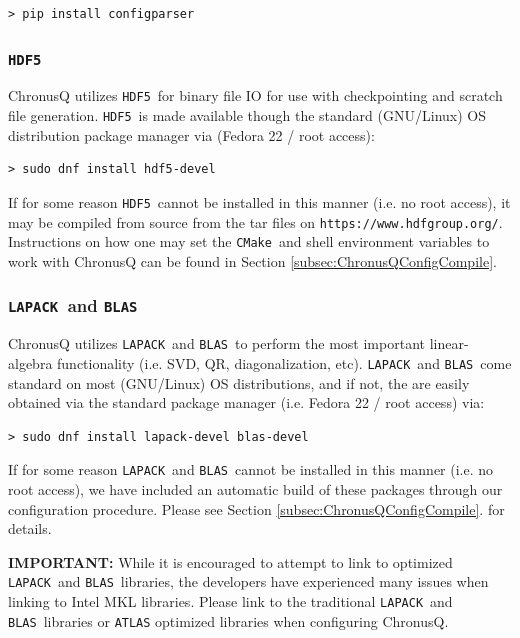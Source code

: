\documentclass[12pt]{article}
\newcommand{\CMake}{\texttt{CMake}}
\newcommand{\HDF}{\texttt{HDF5}}
\newcommand{\LAPACK}{\texttt{LAPACK}}
\newcommand{\BLAS}{\texttt{BLAS}}
\begin{document}
	\begin{lstlisting}
> pip install configparser
	\end{lstlisting}

      \subsubsection{\HDF} \label{subsubsec:HDF5} 
        ChronusQ utilizes \HDF~for binary file IO for use with 
        checkpointing and scratch file generation. \HDF~is made available
	though the standard (GNU/Linux) OS distribution package manager via
	(Fedora 22 / root access):

	\begin{lstlisting}
> sudo dnf install hdf5-devel
	\end{lstlisting}

	\noindent If for some reason \HDF~cannot be installed in this manner (i.e. 
	no root access), it may be compiled from source from the tar files on
	\texttt{https://www.hdfgroup.org/}. Instructions on how one may set
	the \CMake~and shell environment variables to work with ChronusQ
	can be found in Section \ref{subsec:ChronusQConfigCompile}.

      \subsubsection{\LAPACK~and \BLAS} \label{subsubsec:LA} 
        ChronusQ utilizes \LAPACK~and \BLAS~to perform
        the most important linear-algebra functionality (i.e. SVD, QR, 
	diagonalization, etc). \LAPACK~and \BLAS~come standard on most
	(GNU/Linux) OS distributions, and if not, the are easily obtained via
	the standard package manager (i.e. Fedora 22 / root access) via:

	\begin{lstlisting}
> sudo dnf install lapack-devel blas-devel
	\end{lstlisting}

	\noindent If for some reason \LAPACK~and \BLAS~cannot be installed in this 
	manner (i.e. no root access), we have included an automatic build of these 
	packages through our configuration procedure. Please see Section 
	\ref{subsec:ChronusQConfigCompile}. for details.

	\noindent \textbf{IMPORTANT:} While it is encouraged to attempt to link to 
	optimized \LAPACK~and \BLAS~libraries, the developers have experienced many 
	issues when linking to Intel MKL libraries. Please link to the traditional 
	\LAPACK~and \BLAS~libraries or \texttt{ATLAS} optimized libraries when 
	configuring ChronusQ.
\end{document}
